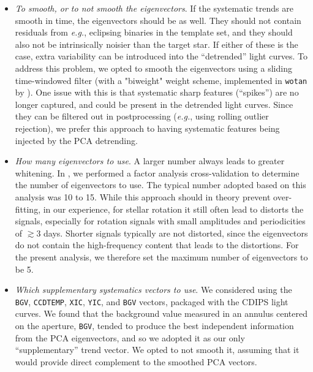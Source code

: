 \documentclass[12pt,twocolumn,tighten]{aastex63}
\begin{document}
\begin{itemize}
  \item {\it To smooth, or to not smooth the eigenvectors}.
    If the systematic trends are smooth in time, the eigenvectors should be as well. They should not
    contain residuals from {\it e.g.}, eclipsing binaries 
    in the template set, and they should also not be
    intrinsically noisier than the target star. If either of these is
    the case, extra
    variability can be introduced into the ``detrended'' light curves.  To address
    this problem, we opted to smooth the eigenvectors using a
    sliding time-windowed filter (with a "biweight" weight scheme, implemented
    in \texttt{wotan} by \citealt{hippke_wotan_2019}).
    One issue with this is that systematic sharp features (``spikes'')
    are no longer captured, and could be present in the detrended light
    curves. Since they can be filtered out in postprocessing
    ({\it e.g.}, using rolling outlier rejection), we prefer this
    approach to having systematic features being injected by the
    PCA detrending.
  \item {\it How many eigenvectors to use}.
    A larger number always leads to greater whitening.  In
    \citet{bouma_cdipsI_2019}, we performed a factor analysis
    cross-validation to determine the number of eigenvectors to use.
    The typical number adopted based on this analysis was 10 to 15.
    While this approach should in theory prevent over-fitting, in our
    experience, for stellar rotation it still often lead to distorts
    the signals, especially for rotation signals with small amplitudes
    and periodicities of $\gtrsim 3$ days.  Shorter signals typically
    are not distorted, since the eigenvectors do not contain the
    high-frequency content that leads to the distortions.  For the
    present analysis, we therefore set the maximum number of
    eigenvectors to be 5.
%
  \item {\it Which supplementary systematics vectors to use}.  We
    considered using the \texttt{BGV}, \texttt{CCDTEMP}, \texttt{XIC},
    \texttt{YIC}, and \texttt{BGV} vectors, packaged with the CDIPS
    light curves. We found that the background value measured in an
    annulus centered on the aperture, \texttt{BGV}, tended to produce
    the best independent information from the PCA eigenvectors, and so
    we adopted it as our only ``supplementary'' trend vector.  We
    opted to not smooth it, assuming that it would provide direct
    complement to the smoothed PCA vectors.
\end{itemize}
\end{document}
